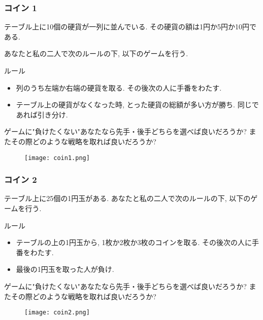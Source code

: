 \documentclass[11pt,dvipdfmx]{beamer}
\theoremstyle{definition}
\theoremstyle{remark}
\begin{document}
\begin{frame}
\frametitle{コイン 1}
テーブル上に10個の硬貨が一列に並んでいる. 
その硬貨の額は1円か5円か10円である. 

あなたと私の二人で次のルールの下, 以下のゲームを行う.

 \begin{block}{ルール}
\begin{itemize}
\item 列のうち左端か右端の硬貨を取る. その後次の人に手番をわたす.
\item テーブル上の硬貨がなくなった時, とった硬貨の総額が多い方が勝ち. 同じであれば引き分け. 
\end{itemize}
   \end{block}

ゲームに"負けたくない"あなたなら先手・後手どちらを選べば良いだろうか?
またその際どのような戦略を取れば良いだろうか?

\begin{figure}[htbp]
\begin{center}
\texttt{[image: coin1.png]}
\end{center}
\end{figure}

\end{frame}


\begin{frame}
\frametitle{コイン 2}
テーブル上に25個の1円玉がある.
あなたと私の二人で次のルールの下, 以下のゲームを行う.

 \begin{block}{ルール}
\begin{itemize}
\item テーブルの上の1円玉から, 1枚か2枚か3枚のコインを取る. その後次の人に手番をわたす. 
\item 最後の1円玉を取った人が負け.
\end{itemize}
   \end{block}

ゲームに"負けたくない"あなたなら先手・後手どちらを選べば良いだろうか?
またその際どのような戦略を取れば良いだろうか?

\begin{figure}[htbp]
\begin{center}
\texttt{[image: coin2.png]}
\end{center}
\end{figure}

\end{frame}
\end{document}
